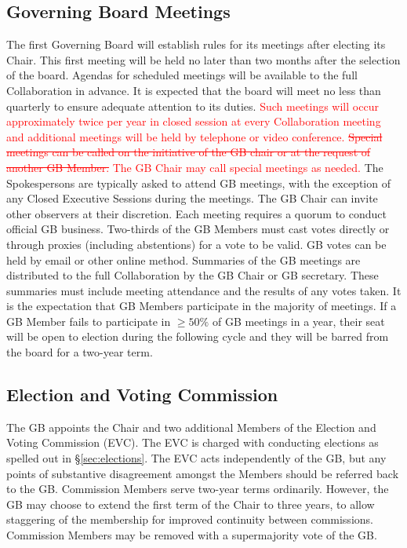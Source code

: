 \documentclass[12pt]{article}
\begin{document}
\subsection{Governing Board Meetings}
The first Governing Board will establish rules for its meetings after electing its Chair. This first meeting will be held no later than two months after the selection of the board.  Agendas for scheduled meetings will be available to the full Collaboration in advance.  It is expected that the board will meet no less than quarterly to ensure adequate attention to its duties. \textcolor{red}{Such meetings will occur approximately twice per year in closed session at every Collaboration meeting and additional meetings will be held by telephone or video conference.  \sout{Special meetings can be called on the initiative of the GB chair or at the request of another GB Member.} The GB Chair may call special meetings as needed.}  The Spokespersons are typically asked to attend GB meetings, with the exception of any Closed Executive Sessions during the meetings.  The GB Chair can invite other observers at their discretion. Each meeting requires a quorum to conduct official GB business. Two-thirds of the GB Members must cast votes directly or through proxies (including abstentions) for a vote to be valid.  
GB votes can be held by email or other online method. Summaries of the GB meetings are distributed to the full Collaboration by the GB Chair or GB secretary. These summaries must include meeting attendance and the %
results of any votes taken.
 It is the expectation that GB Members participate in the majority of meetings. If a GB Member fails to participate %
 in $\ge 50\%$ of GB meetings in a year, their seat will be open to election during the following cycle and they will be barred from the board for a two-year term.  

\subsection{Election and Voting Commission}
The GB appoints the Chair and two additional Members of the Election and Voting Commission (EVC).  The EVC is charged with conducting elections as spelled out in \S\ref{sec:elections}. The EVC acts independently of the GB, but any points of substantive disagreement amongst the Members should be referred back to the GB.  Commission Members serve two-year terms ordinarily.  However, the GB may choose to extend the first term of the Chair to  three years, to allow staggering of the membership for improved continuity between commissions.   Commission Members may be removed with a supermajority vote of the GB.
 
\end{document}
